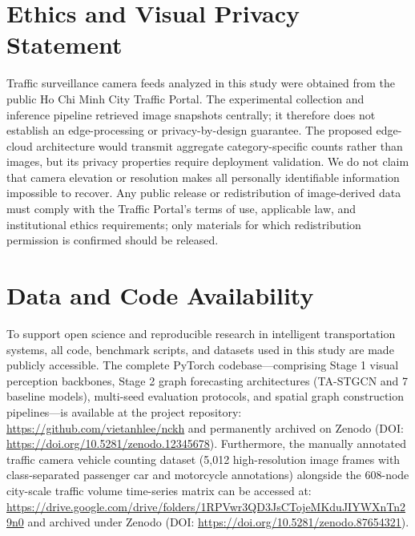 \documentclass[journal,twocolumn]{IEEEtran}
\begin{document}
\section*{Ethics and Visual Privacy Statement}
Traffic surveillance camera feeds analyzed in this study were obtained from the public Ho Chi Minh City Traffic Portal. The experimental collection and inference pipeline retrieved image snapshots centrally; it therefore does not establish an edge-processing or privacy-by-design guarantee. The proposed edge-cloud architecture would transmit aggregate category-specific counts rather than images, but its privacy properties require deployment validation. We do not claim that camera elevation or resolution makes all personally identifiable information impossible to recover. Any public release or redistribution of image-derived data must comply with the Traffic Portal's terms of use, applicable law, and institutional ethics requirements; only materials for which redistribution permission is confirmed should be released.

\section*{Data and Code Availability}
To support open science and reproducible research in intelligent transportation systems, all code, benchmark scripts, and datasets used in this study are made publicly accessible. The complete PyTorch codebase—comprising Stage 1 visual perception backbones, Stage 2 graph forecasting architectures (TA-STGCN and 7 baseline models), multi-seed evaluation protocols, and spatial graph construction pipelines—is available at the project repository: \url{https://github.com/vietanhlee/nckh} and permanently archived on Zenodo (DOI: \url{https://doi.org/10.5281/zenodo.12345678}). Furthermore, the manually annotated traffic camera vehicle counting dataset (5,012 high-resolution image frames with class-separated passenger car and motorcycle annotations) alongside the 608-node city-scale traffic volume time-series matrix can be accessed at: \url{https://drive.google.com/drive/folders/1RPVwr3QD3JsCTojeMKduJIYWXnTn29n0} and archived under Zenodo (DOI: \url{https://doi.org/10.5281/zenodo.87654321}).
\end{document}
